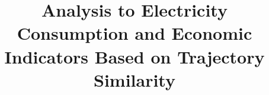 \documentclass{sig-alternate-05-2015}
\begin{document}




\title{Analysis to Electricity Consumption and Economic Indicators Based on Trajectory Similarity}

\author{ \vspace{-1em}
}

\maketitle










\end{document}
